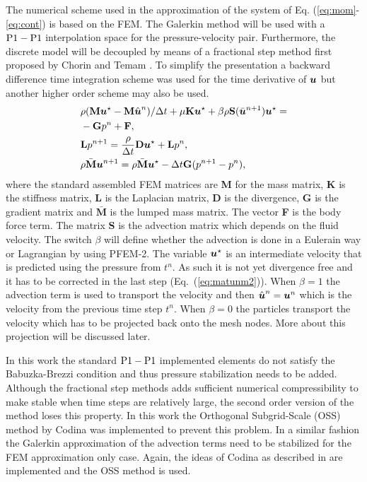 The numerical scheme used in the approximation of the system of Eq. (\ref{eq:mom}-\ref{eq:cont}) is based on the FEM. The Galerkin method will be used with a $\rm{P1}-\rm{P1}$ interpolation space for the pressure-velocity pair. Furthermore, the discrete model will be decoupled by means of a fractional step method first proposed by Chorin \cite{chorin} and Temam \cite{temam}. To simplify the presentation a backward difference time integration scheme was used for the time derivative of $\boldsymbol{u}$ but another higher order scheme may also be used. 
%
\begin{align}\label{eq:masamat}
&\rho (\textbf{M}\boldsymbol{u}^\star-\textbf{M}\hat{\boldsymbol{u}}^n)/\Delta t+\mu\textbf{K}\boldsymbol{u}^{\star} +\beta\rho\textbf{S}(\bar{\boldsymbol{u}}^{n+1})\boldsymbol{u}^{\star}  = \nonumber\\&-\textbf{G}p^n+ \textbf{F},
\\\label{eq:matpres2}
& \textbf{L}p^{n+1}=\frac{\rho}{\Delta t}\textbf{D}\boldsymbol{u}^\star+ \textbf{L}  p^{n},
\\\label{eq:matunm2}
&\rho \bar{\textbf{M}}\boldsymbol{u}^{n+1}=\rho \bar{\textbf{M}}\boldsymbol{u}^\star-\Delta t\textbf{G}(p^{n+1}- p^n),
\end{align}
%
where the standard assembled FEM matrices are \textbf{M} for the mass matrix, \textbf{K} is the stiffness matrix, \textbf{L} is the Laplacian matrix, \textbf{D} is the divergence, \textbf{G} is the gradient matrix and $\bar{\textbf{M}}$ is the lumped mass matrix. The vector \textbf{F} is the body force term. The matrix \textbf{S} is the advection matrix which depends on the fluid velocity. The switch $\beta$ will define whether the advection is done in a Eulerain way or Lagrangian by using PFEM-2. The variable $\boldsymbol{u}^\star$ is an intermediate velocity that is predicted using the pressure from $t^n$. As such it is not yet divergence free and it has to be corrected in the last step (Eq.~(\ref{eq:matunm2})). When $\beta=1$ the advection term is used to transport the velocity and then  $\hat{\boldsymbol{u}}^n=\boldsymbol{u}^n$ which is the velocity from the previous time step $t^n$. When $\beta=0$ the particles transport the velocity which has to be projected back onto the mesh nodes. More about this projection will be discussed later.

In this work the standard $\rm{P1}-\rm{P1}$ implemented elements do not satisfy the Babuzka-Brezzi condition and thus pressure stabilization needs to be added. Although the fractional step methods adds sufficient numerical compressibility to make stable when time steps are relatively large, the second order version of the method loses this property. In this work the Orthogonal Subgrid-Scale (OSS) method by Codina \cite{codina-oss-press} was implemented to prevent this problem. In a similar fashion the Galerkin approximation of the advection terms need to be stabilized for the FEM approximation only case. Again, the ideas of Codina as described in \cite{codina-soto} are implemented and the OSS method is used. 
